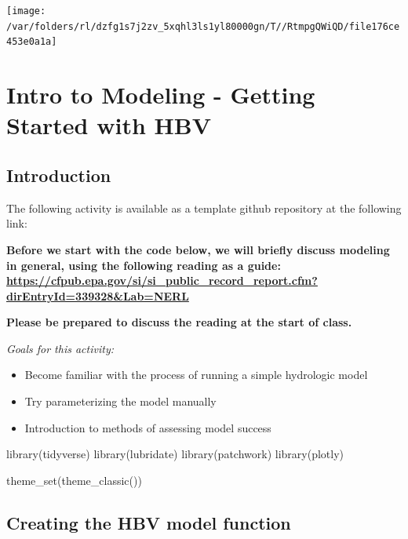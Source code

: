 \documentclass[
]{book}
\newenvironment{Shaded}{\begin{snugshade}}{\end{snugshade}}
\newcommand{\FunctionTok}[1]{\textcolor[rgb]{0.00,0.00,0.00}{#1}}
\newcommand{\NormalTok}[1]{#1}
\providecommand{\tightlist}{%
  \setlength{\itemsep}{0pt}\setlength{\parskip}{0pt}}
\begin{document}
\texttt{[image: /var/folders/rl/dzfg1s7j2zv\_5xqhl3ls1yl80000gn/T//RtmpgQWiQD/file176ce453e0a1a]}

\hypertarget{modelingintro}{%
\chapter{Intro to Modeling - Getting Started with HBV}\label{modelingintro}}

\hypertarget{introduction-5}{%
\section{Introduction}\label{introduction-5}}

The following activity is available as a template github repository at the following link:

\textbf{Before we start with the code below, we will briefly discuss modeling in general, using the following reading as a guide: \url{https://cfpub.epa.gov/si/si_public_record_report.cfm?dirEntryId=339328\&Lab=NERL}}

\textbf{Please be prepared to discuss the reading at the start of class.}

\emph{Goals for this activity:}

\begin{itemize}
\tightlist
\item
  Become familiar with the process of running a simple hydrologic model
\item
  Try parameterizing the model manually
\item
  Introduction to methods of assessing model success
\end{itemize}

\begin{Shaded}
\begin{Highlighting}[]
\FunctionTok{library}\NormalTok{(tidyverse)}
\FunctionTok{library}\NormalTok{(lubridate)}
\FunctionTok{library}\NormalTok{(patchwork)}
\FunctionTok{library}\NormalTok{(plotly)}

\FunctionTok{theme\_set}\NormalTok{(}\FunctionTok{theme\_classic}\NormalTok{())}
\end{Highlighting}
\end{Shaded}

\hypertarget{creating-the-hbv-model-function}{%
\section{Creating the HBV model function}\label{creating-the-hbv-model-function}}
\end{document}
